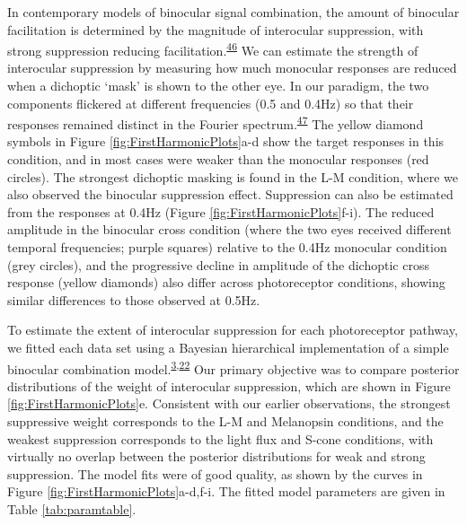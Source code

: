 \documentclass[
]{article}
\begin{document}
In contemporary models of binocular signal combination, the amount of binocular facilitation is determined by the magnitude of interocular suppression, with strong suppression reducing facilitation.\textsuperscript{\protect\hyperlink{ref-Kingdom2015}{46}} We can estimate the strength of interocular suppression by measuring how much monocular responses are reduced when a dichoptic `mask' is shown to the other eye. In our paradigm, the two components flickered at different frequencies (0.5 and 0.4Hz) so that their responses remained distinct in the Fourier spectrum.\textsuperscript{\protect\hyperlink{ref-Busse2009}{47}} The yellow diamond symbols in Figure \ref{fig:FirstHarmonicPlots}a-d show the target responses in this condition, and in most cases were weaker than the monocular responses (red circles). The strongest dichoptic masking is found in the L-M condition, where we also observed the binocular suppression effect. Suppression can also be estimated from the responses at 0.4Hz (Figure \ref{fig:FirstHarmonicPlots}f-i). The reduced amplitude in the binocular cross condition (where the two eyes received different temporal frequencies; purple squares) relative to the 0.4Hz monocular condition (grey circles), and the progressive decline in amplitude of the dichoptic cross response (yellow diamonds) also differ across photoreceptor conditions, showing similar differences to those observed at 0.5Hz.

To estimate the extent of interocular suppression for each photoreceptor pathway, we fitted each data set using a Bayesian hierarchical implementation of a simple binocular combination model.\textsuperscript{\protect\hyperlink{ref-Segala2023}{3},\protect\hyperlink{ref-Meese2006}{22}} Our primary objective was to compare posterior distributions of the weight of interocular suppression, which are shown in Figure \ref{fig:FirstHarmonicPlots}e. Consistent with our earlier observations, the strongest suppressive weight corresponds to the L-M and Melanopsin conditions, and the weakest suppression corresponds to the light flux and S-cone conditions, with virtually no overlap between the posterior distributions for weak and strong suppression. The model fits were of good quality, as shown by the curves in Figure \ref{fig:FirstHarmonicPlots}a-d,f-i. The fitted model parameters are given in Table \ref{tab:paramtable}.
\end{document}
